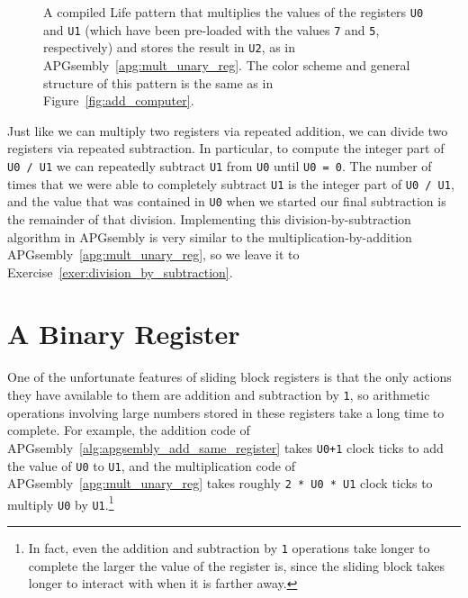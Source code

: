 \begin{figure}[!htb]
	\centering
	\caption{A compiled Life pattern that multiplies the values of the registers \texttt{U0} and \texttt{U1} (which have been pre-loaded with the values \texttt{7} and \texttt{5}, respectively) and stores the result in \texttt{U2}, as in APGsembly~\ref{apg:mult_unary_reg}. The color scheme and general structure of this pattern is the same as in Figure~\ref{fig:add_computer}.}\label{fig:mult_computer}
\end{figure}

Just like we can multiply two registers via repeated addition, we can divide two registers via repeated subtraction. In particular, to compute the integer part of \texttt{U0 / U1} we can repeatedly subtract \texttt{U1} from \texttt{U0} until \texttt{U0 = 0}. The number of times that we were able to completely subtract \texttt{U1} is the integer part of \texttt{U0 / U1}, and the value that was contained in \texttt{U0} when we started our final subtraction is the remainder of that division. Implementing this division-by-subtraction algorithm in APGsembly is very similar to the multiplication-by-addition APGsembly~\ref{apg:mult_unary_reg}, so we leave it to Exercise~\ref{exer:division_by_subtraction}.


\section{A Binary Register}\label{sec:binary_register}

One of the unfortunate features of sliding block registers is that the only actions they have available to them are addition and subtraction by \texttt{1}, so arithmetic operations involving large numbers stored in these registers take a long time to complete. For example, the addition code of APGsembly~\ref{alg:apgsembly_add_same_register} takes \texttt{U0+1} clock ticks to add the value of \texttt{U0} to \texttt{U1}, and the multiplication code of APGsembly~\ref{apg:mult_unary_reg} takes roughly \texttt{2 * U0 * U1} clock ticks to multiply \texttt{U0} by \texttt{U1}.\footnote{In fact, even the addition and subtraction by \texttt{1} operations take longer to complete the larger the value of the register is, since the sliding block takes longer to interact with when it is farther away.}

